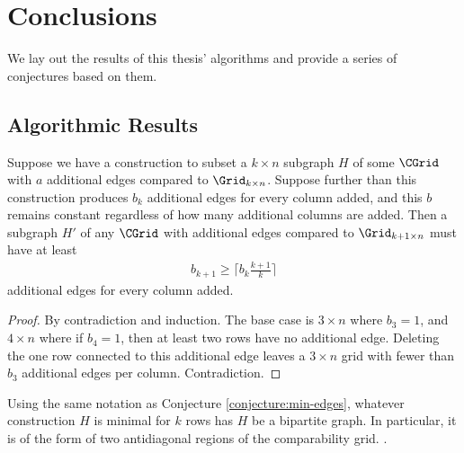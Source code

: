 \section{Conclusions}

We lay out the results of this thesis' algorithms and provide a series of conjectures based on them.

\subsection{Algorithmic Results}


\begin{conjecture}
\label{conjecture:min-edges}
 Suppose we have a construction to subset a $k \times n$ subgraph $H$ of some $\CGrid$ with $a$ additional edges compared to $\Grid_{k \times n}$. Suppose further than this construction produces $b_k$ additional edges for every column added, and this $b$ remains constant regardless of how many additional columns are added. Then a subgraph $H'$ of any $\CGrid$ with additional edges compared to $\Grid_{k+1 \times n}$ must have at least 
\begin{align}
    b_{k+1} \geq \lceil b_k \frac{k+1}{k} \rceil
\end{align}
additional edges for every column added.
\begin{proof}
By contradiction and induction. The base case is $3 \times n$ where $b_3 = 1$, and $4 \times n$ where if $b_4 = 1$, then at least two rows have no additional edge. Deleting the one row connected to this additional edge  leaves a $3 \times n$ grid with fewer than $b_3$ additional edges per column. Contradiction. 
\end{proof}
\end{conjecture}

\begin{conjecture}
Using the same notation as Conjecture \ref{conjecture:min-edges}, whatever construction $H$ is minimal for $k$ rows has $H$ be a bipartite graph. In particular, it is of the form of two antidiagonal regions of the comparability grid. .
\end{conjecture}

